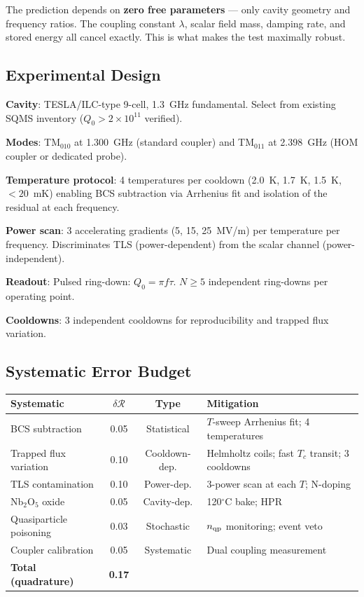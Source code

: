 \documentclass[11pt]{article}
\newcommand{\ee}[1]{\times 10^{#1}}
\newcommand{\Rq}{\mathcal{R}}
\begin{document}
The prediction depends on \textbf{zero free parameters} --- only cavity
geometry and frequency ratios. The coupling constant $\lambda$, scalar
field mass, damping rate, and stored energy all cancel exactly. This
is what makes the test maximally robust.

\subsection{Experimental Design}

\textbf{Cavity}: TESLA/ILC-type 9-cell, 1.3~GHz fundamental. Select
from existing SQMS inventory ($Q_0 > 2\ee{11}$ verified).

\textbf{Modes}: TM$_{010}$ at 1.300~GHz (standard coupler) and
TM$_{011}$ at 2.398~GHz (HOM coupler or dedicated probe).

\textbf{Temperature protocol}: 4 temperatures per cooldown
(2.0~K, 1.7~K, 1.5~K, $<20$~mK) enabling BCS subtraction via
Arrhenius fit and isolation of the residual at each frequency.

\textbf{Power scan}: 3 accelerating gradients (5, 15, 25~MV/m) per
temperature per frequency. Discriminates TLS (power-dependent) from
the scalar channel (power-independent).

\textbf{Readout}: Pulsed ring-down: $Q_0 = \pi f \tau$. $N \geq 5$
independent ring-downs per operating point.

\textbf{Cooldowns}: 3 independent cooldowns for reproducibility and
trapped flux variation.

\subsection{Systematic Error Budget}

\begin{center}
\renewcommand{\arraystretch}{1.3}
\begin{tabular}{@{}p{3cm}ccp{5cm}@{}}
\toprule
\textbf{Systematic} & $\delta\Rq$ & \textbf{Type} &
\textbf{Mitigation} \\
\midrule
BCS subtraction & 0.05 & Statistical & $T$-sweep Arrhenius fit;
4 temperatures \\
Trapped flux variation & 0.10 & Cooldown-dep. & Helmholtz coils;
fast $T_c$ transit; 3 cooldowns \\
TLS contamination & 0.10 & Power-dep. & 3-power scan at each $T$;
N-doping \\
Nb$_2$O$_5$ oxide & 0.05 & Cavity-dep. & 120$^\circ$C bake; HPR \\
Quasiparticle poisoning & 0.03 & Stochastic & $n_{\rm qp}$
monitoring; event veto \\
Coupler calibration & 0.05 & Systematic & Dual coupling measurement \\
\midrule
\textbf{Total (quadrature)} & \textbf{0.17} & & \\
\bottomrule
\end{tabular}
\end{center}
\end{document}
